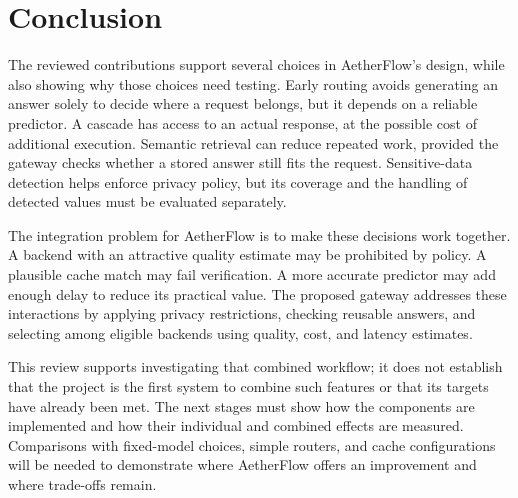 \section{Conclusion}

The reviewed contributions support several choices in AetherFlow's design, while also showing why those choices need testing. Early routing avoids generating an answer solely to decide where a request belongs, but it depends on a reliable predictor. A cascade has access to an actual response, at the possible cost of additional execution. Semantic retrieval can reduce repeated work, provided the gateway checks whether a stored answer still fits the request. Sensitive-data detection helps enforce privacy policy, but its coverage and the handling of detected values must be evaluated separately.

The integration problem for AetherFlow is to make these decisions work together. A backend with an attractive quality estimate may be prohibited by policy. A plausible cache match may fail verification. A more accurate predictor may add enough delay to reduce its practical value. The proposed gateway addresses these interactions by applying privacy restrictions, checking reusable answers, and selecting among eligible backends using quality, cost, and latency estimates.

This review supports investigating that combined workflow; it does not establish that the project is the first system to combine such features or that its targets have already been met. The next stages must show how the components are implemented and how their individual and combined effects are measured. Comparisons with fixed-model choices, simple routers, and cache configurations will be needed to demonstrate where AetherFlow offers an improvement and where trade-offs remain.
\clearpage
